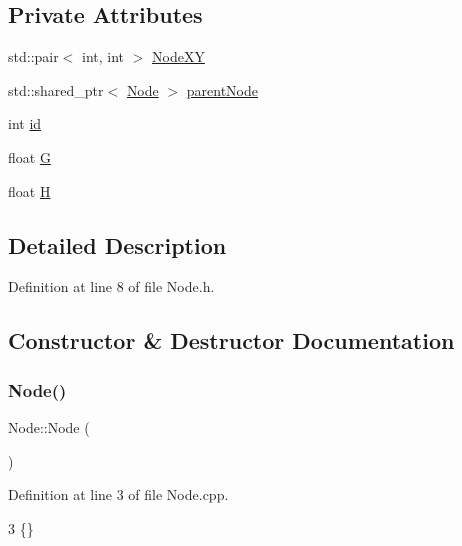\subsection*{Private Attributes}
\begin{DoxyCompactItemize}
\item 
std\+::pair$<$ int, int $>$ \hyperlink{class_node_ac85b927d8c9cdc484f169129d317f6f0}{Node\+XY}
\item 
std\+::shared\+\_\+ptr$<$ \hyperlink{class_node}{Node} $>$ \hyperlink{class_node_aface6c6a7d38a7cc94090ef35bf9e95a}{parent\+Node}
\item 
int \hyperlink{class_node_a59a543130a10c95f1e8642cf8c5645e8}{id}
\item 
float \hyperlink{class_node_a3c6a67023068f762eaaa8a4861ab3e9f}{G}
\item 
float \hyperlink{class_node_a26426055f336a81dc05680b981e4c270}{H}
\end{DoxyCompactItemize}


\subsection{Detailed Description}


Definition at line 8 of file Node.\+h.



\subsection{Constructor \& Destructor Documentation}
\mbox{\label{class_node_ad7a34779cad45d997bfd6d3d8043c75f}} 
\subsubsection{\texorpdfstring{Node()}{Node()}\hspace{0.1cm}{\footnotesize\ttfamily [1/2]}}
{\footnotesize\ttfamily Node\+::\+Node (\begin{DoxyParamCaption}{ }\end{DoxyParamCaption})}



Definition at line 3 of file Node.\+cpp.


\begin{DoxyCode}
3 \{\}
\end{DoxyCode}
\mbox{\label{class_node_ad00949d1efbe6d24086446c2b16e8876}} 
